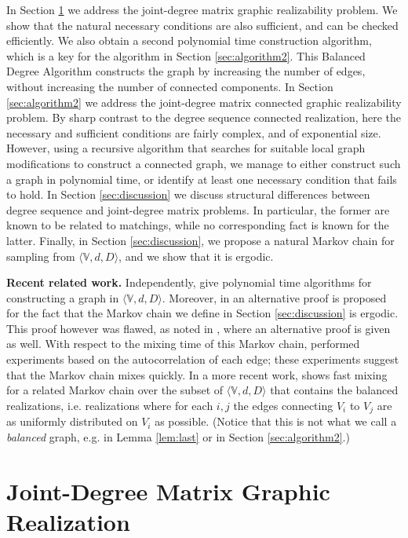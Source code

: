 \documentclass[12pt,a4paper]{article}
\theoremstyle{definition}
\theoremstyle{plain}
\begin{document}
In Section \ref{sec:algorithm1} we address the joint-degree matrix
graphic realizability problem. We show that the natural necessary conditions
are also sufficient, and can be checked efficiently. 
We also obtain a second polynomial time construction 
algorithm, which is a key for the algorithm in Section \ref{sec:algorithm2}.
This Balanced Degree Algorithm constructs the graph by increasing the number of
edges, without increasing the number of connected components.
In Section \ref{sec:algorithm2} we address 
the joint-degree matrix connected graphic realizability problem.
By sharp contrast to the degree sequence connected realization, 
here the necessary and sufficient conditions are fairly complex,
and of exponential size. However, using a recursive algorithm
that searches for suitable local graph modifications to construct
a connected graph, we manage to either construct such a graph in polynomial time, or identify 
at least one necessary condition that fails to hold. 
In Section \ref{sec:discussion} we discuss 
structural differences between degree sequence 
and joint-degree matrix problems. 
In particular, the former are known to be related to 
matchings, while no corresponding fact is known for the latter. 
Finally, in Section \ref{sec:discussion}, we propose a natural Markov chain 
for sampling from $\langle{\mathbb V},d,D\rangle$, and we show  that it is 
ergodic.

\noindent \textbf{Recent related work.} Independently, \cite{SP12, CDEM15, GTM15} give polynomial time algorithms for constructing a graph in $\langle{\mathbb V},d,D\rangle$. Moreover, in \cite{SP12} an alternative proof is proposed for the fact that the Markov chain we define in Section \ref{sec:discussion} is ergodic. This proof however was flawed, as noted in \cite{CDEM15}, where an alternative proof is given as well. With respect to the mixing time of this Markov chain, \cite{SP12} performed experiments based on the autocorrelation of each edge; these experiments
suggest that the Markov chain mixes quickly. In a more recent work, \cite{EMT15} shows fast mixing for a related Markov chain over the subset of $\langle{\mathbb V},d,D\rangle$ that contains the balanced realizations, i.e. realizations where for each $i, j$ the edges connecting $V_i$ to $V_j$ are as uniformly distributed on $V_i$ as possible. (Notice that this is not what we call a \emph{balanced} graph, e.g. in Lemma \ref{lem:last} or in Section \ref{sec:algorithm2}.)



\section{Joint-Degree Matrix Graphic Realization}
\label{sec:algorithm1}
\end{document}
